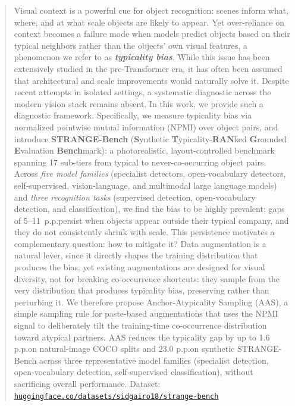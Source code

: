 \vspace{-11pt}
\begin{abstract}
Visual context is a powerful cue for object recognition: scenes inform what, where, and at what scale objects are likely to appear. Yet over-reliance on context becomes a failure mode when models predict objects based on their typical neighbors rather than the objects' own visual features, a phenomenon we refer to as \textit{\textbf{typicality bias}}. While this issue has been extensively studied in the pre-Transformer era, it has often been assumed that architectural and scale improvements would naturally solve it. Despite recent attempts in isolated settings, a systematic diagnostic across the modern vision stack remains absent.
In this work, we provide such a diagnostic framework. Specifically, we measure typicality bias via normalized pointwise mutual information (NPMI) over object pairs, and introduce \textbf{STRANGE-Bench} (\textbf{S}ynthetic \textbf{T}ypicality-\textbf{RAN}ked \textbf{G}rounded \textbf{E}valuation \textbf{Bench}mark): a photorealistic, layout-controlled benchmark spanning 17 sub-tiers from typical to never-co-occurring object pairs. Across \textit{five model families} (specialist detectors, open-vocabulary detectors, self-supervised, vision-language, and multimodal large language models) and \textit{three recognition tasks} (supervised detection, open-vocabulary detection, and classification), we find the bias to be highly prevalent: gaps of 5--11~p.p.\@ persist when objects appear outside their typical company, and they do not consistently shrink with scale.
This persistence motivates a complementary question: how to mitigate it? Data augmentation is a natural lever, since it directly shapes the training distribution that produces the bias; yet existing augmentations are designed for visual diversity, not for breaking co-occurrence shortcuts: they sample from the very distribution that produces typicality bias, preserving rather than perturbing it. We therefore propose Anchor-Atypicality Sampling (AAS), a simple sampling rule for paste-based augmentations that uses the NPMI signal to deliberately tilt the training-time co-occurrence distribution toward atypical partners. AAS reduces the typicality gap by up to 1.6 p.p.\@ on natural-image COCO splits and 23.0 p.p.\@ on synthetic STRANGE-Bench across three representative model families (specialist detection, open-vocabulary detection, self-supervised classification), without sacrificing overall performance. Dataset: \href{https://huggingface.co/datasets/sidgairo18/strange-bench}{\nolinkurl{huggingface.co/datasets/sidgairo18/strange-bench}}

\end{abstract}
\vspace{-10pt}
